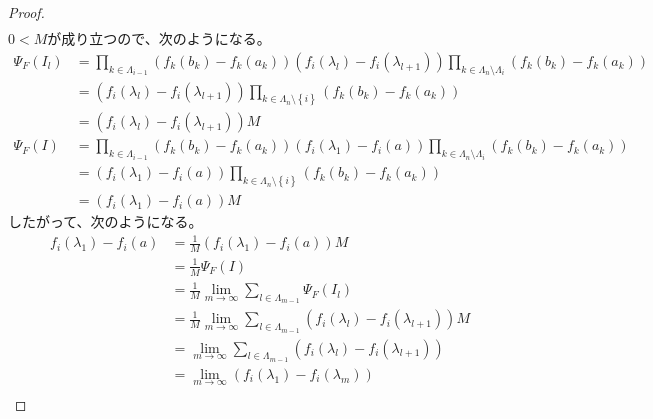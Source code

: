 \documentclass[dvipdfmx]{jsarticle}
\begin{document}
\begin{proof}
\begin{align*}
\end{align*}
$0 < M$が成り立つので、次のようになる。
\begin{align*}
\varPsi_{F}\left( I_{l} \right) &= \prod_{k \in \varLambda_{i - 1}} \left( f_{k}\left( b_{k} \right) - f_{k}\left( a_{k} \right) \right)\left( f_{i}\left( \lambda_{l} \right) - f_{i}\left( \lambda_{l + 1} \right) \right)\prod_{k \in \varLambda_{n} \setminus \varLambda_{i}} \left( f_{k}\left( b_{k} \right) - f_{k}\left( a_{k} \right) \right)\\
&= \left( f_{i}\left( \lambda_{l} \right) - f_{i}\left( \lambda_{l + 1} \right) \right)\prod_{k \in \varLambda_{n} \setminus \left\{ i \right\}} \left( f_{k}\left( b_{k} \right) - f_{k}\left( a_{k} \right) \right)\\
&= \left( f_{i}\left( \lambda_{l} \right) - f_{i}\left( \lambda_{l + 1} \right) \right)M\\
\varPsi_{F}(I) &= \prod_{k \in \varLambda_{i - 1}} \left( f_{k}\left( b_{k} \right) - f_{k}\left( a_{k} \right) \right)\left( f_{i}\left( \lambda_{1} \right) - f_{i}(a) \right)\prod_{k \in \varLambda_{n} \setminus \varLambda_{i}} \left( f_{k}\left( b_{k} \right) - f_{k}\left( a_{k} \right) \right)\\
&= \left( f_{i}\left( \lambda_{1} \right) - f_{i}(a) \right)\prod_{k \in \varLambda_{n} \setminus \left\{ i \right\}} \left( f_{k}\left( b_{k} \right) - f_{k}\left( a_{k} \right) \right)\\
&= \left( f_{i}\left( \lambda_{1} \right) - f_{i}(a) \right)M
\end{align*}
したがって、次のようになる。
\begin{align*}
f_{i}\left( \lambda_{1} \right) - f_{i}(a) &= \frac{1}{M}\left( f_{i}\left( \lambda_{1} \right) - f_{i}(a) \right)M\\
&= \frac{1}{M}\varPsi_{F}(I)\\
&= \frac{1}{M}\lim_{m \rightarrow \infty}{\sum_{l \in \varLambda_{m - 1}} {\varPsi_{F}\left( I_{l} \right)}}\\
&= \frac{1}{M}\lim_{m \rightarrow \infty}{\sum_{l \in \varLambda_{m - 1}} {\left( f_{i}\left( \lambda_{l} \right) - f_{i}\left( \lambda_{l + 1} \right) \right)M}}\\
&= \lim_{m \rightarrow \infty}{\sum_{l \in \varLambda_{m - 1}} \left( f_{i}\left( \lambda_{l} \right) - f_{i}\left( \lambda_{l + 1} \right) \right)}\\
&= \lim_{m \rightarrow \infty}\left( f_{i}\left( \lambda_{1} \right) - f_{i}\left( \lambda_{m} \right) \right)\\

\end{align*}
\end{proof}
\end{document}
